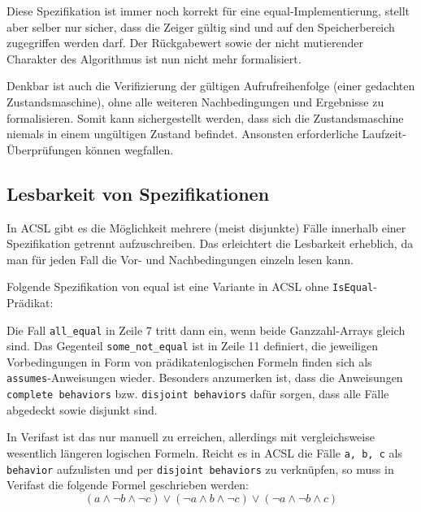 
 
Diese Spezifikation ist immer noch korrekt für eine equal-Implementierung, stellt aber selber nur sicher,
dass die Zeiger gültig sind und auf den Speicherbereich zugegriffen werden darf. Der Rückgabewert sowie 
der nicht mutierender Charakter des Algorithmus ist nun nicht mehr formalisiert.

Denkbar ist auch die Verifizierung der gültigen Aufrufreihenfolge (einer gedachten Zustandsmaschine),
ohne alle weiteren Nachbedingungen und Ergebnisse zu formalisieren. Somit kann sichergestellt werden,
dass sich die Zustandsmaschine niemals in einem ungültigen Zustand befindet. Ansonsten erforderliche
Laufzeit-Überprüfungen können wegfallen.



\subsection{Lesbarkeit von Spezifikationen}
\label{sec:design-by-contract:behaviors}

In ACSL gibt es die Möglichkeit mehrere (meist disjunkte) Fälle innerhalb einer Spezifikation getrennt
aufzuschreiben. Das erleichtert die Lesbarkeit erheblich, da man für jeden Fall die Vor- und Nachbedingungen
einzeln lesen kann.

Folgende Spezifikation von equal ist eine Variante in ACSL ohne \lstinline{IsEqual}-Prädikat:



Die Fall \lstinline{all_equal} in Zeile 7 tritt dann ein, wenn beide Ganzzahl-Arrays gleich sind. Das Gegenteil
\lstinline{some_not_equal} ist in Zeile 11 definiert, die jeweiligen Vorbedingungen in Form von
prädikatenlogischen Formeln finden sich als \lstinline{assumes}-Anweisungen wieder. Besonders anzumerken ist,
dass die Anweisungen \lstinline{complete behaviors} bzw. \lstinline{disjoint behaviors} dafür sorgen, dass
alle Fälle abgedeckt sowie disjunkt sind.

In Verifast ist das nur manuell zu erreichen, allerdings mit vergleichsweise wesentlich längeren logischen Formeln.
Reicht es in ACSL die Fälle \lstinline{a, b, c} als \lstinline{behavior} aufzulisten und per \lstinline{disjoint behaviors}
zu verknüpfen, so muss in Verifast die folgende Formel geschrieben werden:
\[(a \land \neg b \land \neg c) \lor (\neg a \land b \land \neg c) \lor (\neg a \land \neg b \land c)\]

